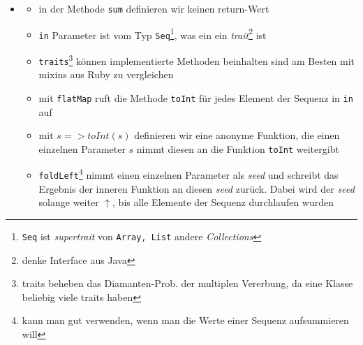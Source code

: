 \begin{itemize}
\begin{itemize}
\begin{itemize}
      $\Rightarrow$ gut wenn man Business-Logik schreibt und diesen Fall
      nicht in jeder Abfrage, sondern einfach am Ergebnistyp der Funktion
      festlegt\footnote{denke an Adminbill aus pictrs}
      \item Parsing des Strings: sollte eben keine zahl eingegeben
      werden, so wird keine Exception geworfen, sondern die Ausgabe
      einfach auf \texttt{None} gemappt
    \end{itemize}
    \item {}
    \begin{itemize}
      \item in der Methode \texttt{sum} definieren wir keinen return-Wert
      \item \texttt{in} Parameter ist vom Typ 
      \texttt{Seq}\footnote{\texttt{Seq} ist \textit{supertrait} von 
      \texttt{Array, List} \und andere \textit{Collections}}, was ein 
      ein \textit{trait}\footnote{denke Interface aus Java} ist
      \item \texttt{traits}\footnote{traits beheben das Diamanten-Prob. 
      der multiplen Vererbung, da eine Klasse beliebig viele traits haben} 
      können implementierte Methoden beinhalten \und sind am Besten mit 
      mixins aus Ruby zu vergleichen
      \item mit \texttt{flatMap} ruft die Methode \texttt{toInt}
      für jedes Element der Sequenz in \texttt{in} auf
      \item mit $s => toInt(s)$ definieren wir eine anonyme
      Funktion, die einen einzelnen Parameter $s$ nimmt \und diesen
      an die Funktion \texttt{toInt} weitergibt
      \item \texttt{foldLeft}\footnote{kann man gut verwenden, wenn man die 
      Werte einer Sequenz aufsummieren will} nimmt einen einzelnen Parameter als
      \textit{seed} \und und schreibt das Ergebnis der inneren
      Funktion an diesen \textit{seed} zurück. Dabei wird der 
      \textit{seed} solange weiter $\uparrow$, bis alle Elemente der 
      Sequenz durchlaufen wurden
    \end{itemize}
  \end{itemize}
\end{itemize}
\pagebreak


